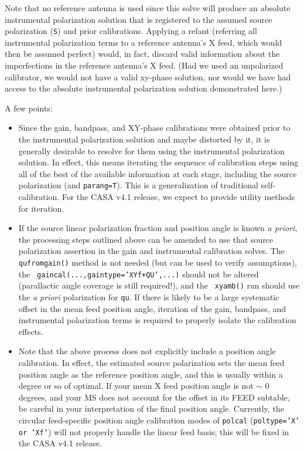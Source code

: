 Note that no reference antenna is used since this solve will produce
an absolute instrumental polarization solution that is registered
to the assumed source polarization ({\tt S}) and prior calibrations.
Applying a refant (referring all instrumental polarization terms
to a reference antenna's X feed, which would then be assumed perfect)
would, in fact, discard valid information about the imperfections
in the reference antenna's X feed.  (Had we used an unpolarized
calibrator, we would not have a valid xy-phase solution, nor would
we have had access to the absolute instrumental polarization solution
demonstrated here.)

A few points:

\begin{itemize}

\item Since the gain, bandpass, and XY-phase calibrations were obtained
prior to the instrumental polarization solution and maybe distorted by
it, it is generally desirable to resolve for them using the
instrumental polarization solution.  In effect, this means iterating
the sequence of calibration steps using all of the best of the
available information at each stage, including the source
polarization (and {\tt parang=T}).  This is a generalization
of traditional self-calibration.  For the CASA v4.1 release,
we expect to provide utility methods for iteration.

\item If the source linear polarization fraction and position angle is
known {\em a priori}, the processing steps outlined above can be
amended to use that source polarization assertion in the gain and
instrumental calibration solves.  The {\tt qufromgain()} method is not
needed (but can be used to verify assumptions), the {\tt
gaincal(...,gaintype='XYf+QU',...)} should not be altered (parallactic
angle coverage is still required!), and the {\tt
xyamb()} run should use the {\em a priori} polarization for {\tt qu}.
If there is likely to be a large systematic offset in the mean
feed position angle, iteration of the gain, bandpass, and instrumental
polarization terms is required to properly isolate the calibration
effects.

\item Note that the above process does not explicitly include a position
angle calibration.  In effect, the estimated source polarization sets
the mean feed position angle as the reference position angle, and this
is usually within a degree or so of optimal.  If your mean X feed
position angle is not $\sim$ 0 degrees, and your MS does not account
for the offset in its FEED subtable, be careful in your interpretation
of the final position angle. Currently, the circular feed-specific
position angle calibration modes of {\tt polcal} ({\tt poltype='X' or
'Xf'}) will not properly handle the linear feed basis; this will
be fixed in the CASA v4.1 release.

\end{itemize}



